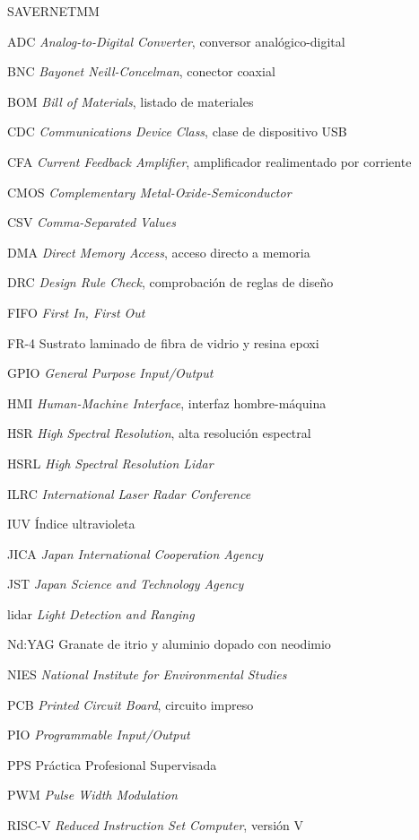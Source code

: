 \begin{listasimbolos}{SAVERNETMM}
\item[ADC] \emph{Analog-to-Digital Converter}, conversor analógico-digital
\item[BNC] \emph{Bayonet Neill-Concelman}, conector coaxial
\item[BOM] \emph{Bill of Materials}, listado de materiales
\item[CDC] \emph{Communications Device Class}, clase de dispositivo USB
\item[CFA] \emph{Current Feedback Amplifier}, amplificador realimentado por corriente
\item[CMOS] \emph{Complementary Metal-Oxide-Semiconductor}
\item[CSV] \emph{Comma-Separated Values}
\item[DMA] \emph{Direct Memory Access}, acceso directo a memoria
\item[DRC] \emph{Design Rule Check}, comprobación de reglas de diseño
\item[FIFO] \emph{First In, First Out}
\item[FR-4] Sustrato laminado de fibra de vidrio y resina epoxi
\item[GPIO] \emph{General Purpose Input/Output}
\item[HMI] \emph{Human-Machine Interface}, interfaz hombre-máquina
\item[HSR] \emph{High Spectral Resolution}, alta resolución espectral
\item[HSRL] \emph{High Spectral Resolution Lidar}
\item[ILRC] \emph{International Laser Radar Conference}
\item[IUV] Índice ultravioleta
\item[JICA] \emph{Japan International Cooperation Agency}
\item[JST] \emph{Japan Science and Technology Agency}
\item[lidar] \emph{Light Detection and Ranging}
\item[Nd:YAG] Granate de itrio y aluminio dopado con neodimio
\item[NIES] \emph{National Institute for Environmental Studies}
\item[PCB] \emph{Printed Circuit Board}, circuito impreso
\item[PIO] \emph{Programmable Input/Output}
\item[PPS] Práctica Profesional Supervisada
\item[PWM] \emph{Pulse Width Modulation}
\item[RISC-V] \emph{Reduced Instruction Set Computer}, versión V

\end{listasimbolos}
